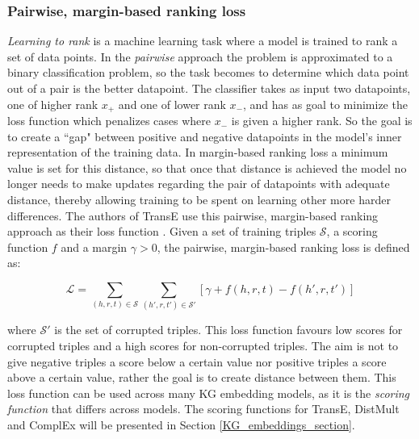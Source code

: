 \subsubsection{Pairwise, margin-based ranking loss}
\textit{Learning to rank} is a machine learning task where a model is trained to rank a set of data points. In the \textit{pairwise} approach the problem is approximated to a binary classification problem, so the task becomes to determine which data point out of a pair is the better datapoint. The classifier takes as input two datapoints, one of higher rank $x_{+}$ and one of lower rank $x_{-}$, and has as goal to minimize the loss function which penalizes cases where $x_{-}$ is given a higher rank. So the goal is to create a ``gap" between positive and negative datapoints in the model's inner representation of the training data. In margin-based ranking loss a minimum value is set for this distance, so that once that distance is achieved the model no longer needs to make updates regarding the pair of datapoints with adequate distance, thereby allowing training to be spent on learning other more harder differences.  The authors of TransE use this pairwise, margin-based ranking approach as their loss function \cite{TransE}. Given a set of training triples $\mathcal{S}$, a scoring function $f$ and a margin $\gamma > 0$, the pairwise, margin-based ranking loss is defined as:

\[\mathcal{L}=\sum_{(h, r, t) \in \mathcal{S}}\sum_{(h', r, t') \in \mathcal{S'}}[\gamma + f(h, r, t) - f(h', r, t')]\]

where $\mathcal{S'}$ is the set of corrupted triples. This loss function favours low scores for corrupted triples and a high scores for non-corrupted triples. The aim is not to give negative triples a score below a certain value nor positive triples a score above a certain value, rather the goal is to create distance between them. This loss function can be used across many KG embedding models, as it is the \textit{scoring function} that differs across models. The scoring functions for TransE, DistMult and ComplEx will be presented in Section \ref{KG_embeddings_section}.


